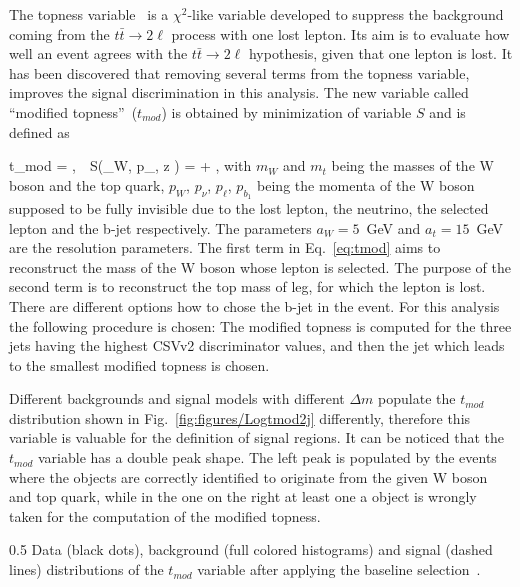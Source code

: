 The topness variable~\cite{Graesser:2012qy} is a $\chi^{2}$-like variable developed to suppress the background coming from the $t \bar{t} \to 2\ell$ process with one lost lepton. Its aim is to evaluate how well an event agrees with the $t \bar{t} \to 2\ell$ hypothesis, given that one lepton is lost. It has been discovered that removing several terms from the topness variable, improves the signal discrimination in this analysis. The new variable called ``modified topness''~($t_{mod}$) is obtained by minimization of variable $S$ and is defined as 


{
 t_{mod} = ,~~S(_{W}, p_{\nu, z} ) =  + ,
}
with $m_{W}$ and  $m_{t}$ being the masses of the W boson and the top quark, ${p}_{W}$, ${p}_{\nu}$, ${p}_{\ell}$, ${p}_{b_{1}}$ being the momenta of the W boson supposed to be fully invisible due to the lost lepton, the neutrino, the selected lepton and the b-jet respectively. The parameters $a_{W} =5$~GeV and $a_{t}=15$~GeV are the resolution parameters. The first term in Eq.~\ref{eq:tmod} aims to reconstruct the mass of the W boson whose lepton is selected. The purpose of the second term is to reconstruct the top mass of leg, for which the lepton is lost. There are different options how to chose the  b-jet in the event. For this analysis the following procedure is chosen: The modified topness is computed for the three jets having the highest CSVv2 discriminator values, and then the jet which leads to the smallest modified topness is chosen.

Different backgrounds and signal models with different $\Delta m$ populate the $t_{mod}$ distribution shown in Fig.~\ref{fig:figures/Logtmod2j} differently, therefore this variable is valuable for the definition of signal regions. It can be noticed that the $t_{mod}$ variable has a double peak shape. The left peak is populated by the events where the objects are correctly identified to originate from the given W boson and top quark, while in the one on the right at least one a object is wrongly taken for the computation of the modified topness.

                 {0.5}       %
                 { Data (black dots), background (full colored histograms) and signal (dashed lines) distributions of the $t_{mod}$  variable after applying the baseline selection~\cite{website:stopSupp}. }

